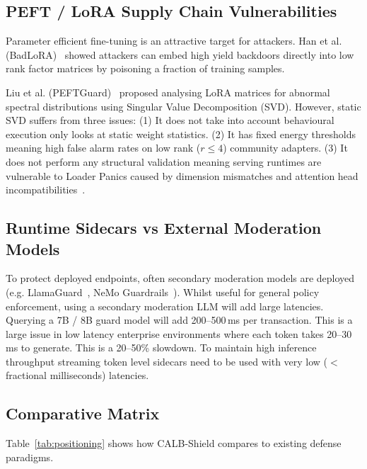 \documentclass[conference]{IEEEtran}
\begin{document}
\subsection{PEFT / LoRA Supply Chain Vulnerabilities}
Parameter efficient fine-tuning is an attractive target for attackers. Han et al. (BadLoRA)~\cite{han2024badlora} showed attackers can embed high yield backdoors directly into low rank factor matrices by poisoning a fraction of training samples.

Liu et al. (PEFTGuard)~\cite{liu2025peftguard} proposed analysing LoRA matrices for abnormal spectral distributions using Singular Value Decomposition (SVD). However, static SVD suffers from three issues: (1) It does not take into account behavioural execution only looks at static weight statistics. (2) It has fixed energy thresholds meaning high false alarm rates on low rank ($r \le 4$) community adapters. (3) It does not perform any structural validation meaning serving runtimes are vulnerable to Loader Panics caused by dimension mismatches and attention head incompatibilities~\cite{owasp2024cyclonedx,euaiact2024}.

\subsection{Runtime Sidecars vs External Moderation Models}
To protect deployed endpoints, often secondary moderation models are deployed (e.g. LlamaGuard~\cite{inan2023llama}, NeMo Guardrails~\cite{rebedea2023nemo}). Whilst useful for general policy enforcement, using a secondary moderation LLM will add large latencies. Querying a 7B / 8B guard model will add 200--500\,ms per transaction. This is a large issue in low latency enterprise environments where each token takes 20--30\,ms to generate. This is a 20--50\% slowdown. To maintain high inference throughput streaming token level sidecars need to be used with very low ($<$ fractional milliseconds) latencies.

\subsection{Comparative Matrix}
Table~\ref{tab:positioning} shows how CALB-Shield compares to existing defense paradigms.
\end{document}
